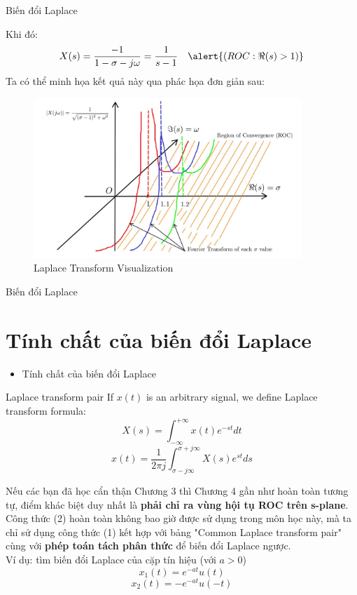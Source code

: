 \documentclass[8pt]{beamer}
\begin{document}
\begin{frame}{Biến đổi Laplace}

	Khi đó: $$X(s)=\frac{-1}{1-\sigma-j\omega}=\frac{1}{s-1} \quad \alert{(ROC:\Re{(s)}>1)}$$
Ta có thể minh họa kết quả này qua phác họa đơn giản sau:
\begin{figure}[h]
			\includegraphics[width=0.9\textwidth]{laplace.jpg}
			\caption{Laplace Transform Visualization}\label{fig:re1}

		\end{figure}

\end{frame}
\begin{frame}{Biến đổi Laplace}
\section{Tính chất của biến đổi Laplace}
\begin{itemize}
	\item Tính chất của biến đổi Laplace
\end{itemize}
\begin{block}{Laplace transform pair}
If $x(t)$ is an arbitrary signal, we define Laplace transform formula:
$$X(s)=\int_{-\infty}^{+\infty}x(t)e^{-st}dt$$
$$x(t)=\frac{1}{2\pi j}\int_{\sigma-j\infty}^{\sigma+j\infty} X(s)e^{st}ds$$
\end{block}
Nếu các bạn đã học cẩn thận \alert{Chương 3} thì \alert{Chương 4} gần như hoàn toàn tương tự, điểm khác biệt duy nhất là \textbf{phải chỉ ra vùng hội tụ ROC trên s-plane}. Công thức (2) hoàn toàn không bao giờ được sử dụng trong môn học này, mà ta chỉ sử dụng công thức (1) kết hợp với bảng "Common Laplace transform pair" cùng với \textbf{phép toán tách phân thức} để biến đổi Laplace ngược.
\\ Ví dụ: tìm biến đổi Laplace của cặp tín hiệu (với $a>0$)
$$x_{1}(t)=e^{-at}u(t)$$ $$x_{2}(t)=-e^{-at}u(-t)$$ 
\end{frame}
\end{document}
